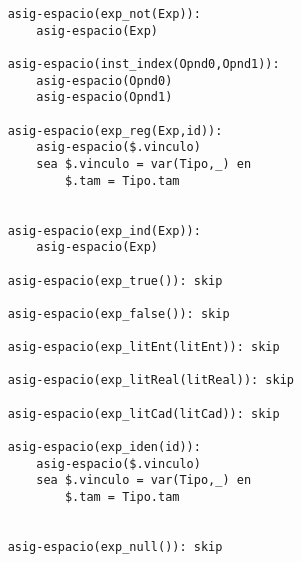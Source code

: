 \begin{lstlisting}
    asig-espacio(exp_not(Exp)):
        asig-espacio(Exp)

    asig-espacio(inst_index(Opnd0,Opnd1)):
        asig-espacio(Opnd0)
        asig-espacio(Opnd1)

    asig-espacio(exp_reg(Exp,id)):
        asig-espacio($.vinculo)
        sea $.vinculo = var(Tipo,_) en
            $.tam = Tipo.tam
       

    asig-espacio(exp_ind(Exp)):
        asig-espacio(Exp)

    asig-espacio(exp_true()): skip

    asig-espacio(exp_false()): skip

    asig-espacio(exp_litEnt(litEnt)): skip

    asig-espacio(exp_litReal(litReal)): skip

    asig-espacio(exp_litCad(litCad)): skip

    asig-espacio(exp_iden(id)):
        asig-espacio($.vinculo)
        sea $.vinculo = var(Tipo,_) en
            $.tam = Tipo.tam
            

    asig-espacio(exp_null()): skip


\end{lstlisting}